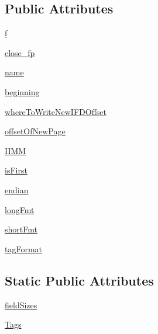 \subsection*{Public Attributes}
\begin{DoxyCompactItemize}
\item 
\hyperlink{classPIL_1_1TiffImagePlugin_1_1AppendingTiffWriter_ad7bd8350d3ffe8a196233f6222983dad}{f}
\item 
\hyperlink{classPIL_1_1TiffImagePlugin_1_1AppendingTiffWriter_aae1273b3810a92a0efdd35ec40218743}{close\+\_\+fp}
\item 
\hyperlink{classPIL_1_1TiffImagePlugin_1_1AppendingTiffWriter_accb97676728ff478b1a53ffbc804dd8c}{name}
\item 
\hyperlink{classPIL_1_1TiffImagePlugin_1_1AppendingTiffWriter_adffaf5d987860a57f1971837b9292292}{beginning}
\item 
\hyperlink{classPIL_1_1TiffImagePlugin_1_1AppendingTiffWriter_a183a91dab507f5f3f52ae1511f011a88}{where\+To\+Write\+New\+I\+F\+D\+Offset}
\item 
\hyperlink{classPIL_1_1TiffImagePlugin_1_1AppendingTiffWriter_a9d7077a76e9f20c45fdd9e8d85250af2}{offset\+Of\+New\+Page}
\item 
\hyperlink{classPIL_1_1TiffImagePlugin_1_1AppendingTiffWriter_a260bc5d5031ac9dbd40f88ac916fca38}{I\+I\+MM}
\item 
\hyperlink{classPIL_1_1TiffImagePlugin_1_1AppendingTiffWriter_a9bd93a2dff55c54bf9bd3a9712b8bbeb}{is\+First}
\item 
\hyperlink{classPIL_1_1TiffImagePlugin_1_1AppendingTiffWriter_a47220a6f1fb010f5be093af0a5a9d6df}{endian}
\item 
\hyperlink{classPIL_1_1TiffImagePlugin_1_1AppendingTiffWriter_a450ca30678e729c0cf7c31e0cf1d2f18}{long\+Fmt}
\item 
\hyperlink{classPIL_1_1TiffImagePlugin_1_1AppendingTiffWriter_ab9e3367126f3c521ec40bd006f744f47}{short\+Fmt}
\item 
\hyperlink{classPIL_1_1TiffImagePlugin_1_1AppendingTiffWriter_aaa6e13aaaabfd66af58311cc9423d32d}{tag\+Format}
\end{DoxyCompactItemize}
\subsection*{Static Public Attributes}
\begin{DoxyCompactItemize}
\item 
\hyperlink{classPIL_1_1TiffImagePlugin_1_1AppendingTiffWriter_a7a8169e55b4801890fdcb030cf9da098}{field\+Sizes}
\item 
\hyperlink{classPIL_1_1TiffImagePlugin_1_1AppendingTiffWriter_ab32d1a3968029c11f1b946a8975e6baf}{Tags}
\end{DoxyCompactItemize}


